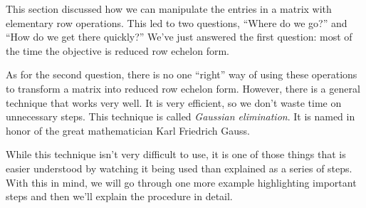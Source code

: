 This section discussed how we can manipulate the entries in a matrix with elementary row operations. This led to two questions, ``Where do we go?'' and ``How do we get there quickly?'' We've just answered the first question: most of the time the objective is reduced row echelon form. 

As for the second question, there is no one ``right'' way of using these operations to transform a matrix into reduced row echelon form. However, there is a general technique that works very well. It is very efficient, so we don't waste time on unnecessary steps. This technique is called 
\textit{Gaussian elimination}. It is named in honor of the great mathematician Karl Friedrich Gauss.

While this technique isn't very difficult to use, it is one of those things that is easier understood by watching it being used than explained as a series of steps. With this in mind, we will go through one more example highlighting important steps and then we'll explain the procedure in detail.\\

